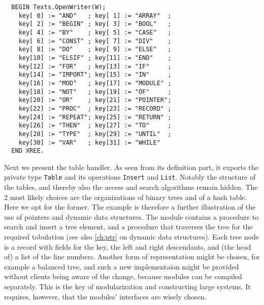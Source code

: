 \begin{verbatim}
  BEGIN Texts.OpenWriter(W);
    key[ 0] := "AND"   ; key[ 1] := "ARRAY"  ;
    key[ 2] := "BEGIN" ; key[ 3] := "BOOL"   ;
    key[ 4] := "BY"    ; key[ 5] := "CASE"   ;
    key[ 6] := "CONST" ; key[ 7] := "DIV"    ;
    key[ 8] := "DO"    ; key[ 9] := "ELSE"   ;
    key[10] := "ELSIF" ; key[11] := "END"    ;
    key[12] := "FOR"   ; key[13] := "IF"     ;
    key[14] := "IMPORT"; key[15] := "IN"     ;
    key[16] := "MOD"   ; key[17] := "MODULE" ;
    key[18] := "NOT"   ; key[19] := "OF"     ;
    key[20] := "OR"    ; key[21] := "POINTER";
    key[22] := "PROC"  ; key[23] := "RECORD" ;
    key[24] := "REPEAT"; key[25] := "RETURN" ;
    key[26] := "THEN"  ; key[27] := "TO"     ;
    key[28] := "TYPE"  ; key[29] := "UNTIL"  ;
    key[30] := "VAR"   ; key[31] := "WHILE"
  END XREE.
\end{verbatim}
Next we present the table handler. As seen from its definition part, it exports the private
type \verb|Table| and its operations \verb|Insert| and \verb|List|. Notably the structure
of the tables, and thereby also the access and search algorithms remain hidden. The 2 most
likely choices are the organizations of binary trees and of a hash table. Here we opt for
the former. The example is therefore a further illustration of the use of pointers and
dynamic data structures. The module contains a procedure to search and insert a tree element,
and a procedure that traverses the tree for the required tabulation (see also \ref{ch:ptr}
on dynamic data structures). Each tree node is a record with fields for the key, the left
and right descendants, and (the head of) a list of the line numbers. Another form of
representation might be chosen, for example a balanced tree, and such a new implementaion
might be provided without clients being aware of the change, because modules can be compiled
separately. This is the key of modularization and constructing large systems. It requires,
however, that the modules’ interfaces are wisely chosen.
